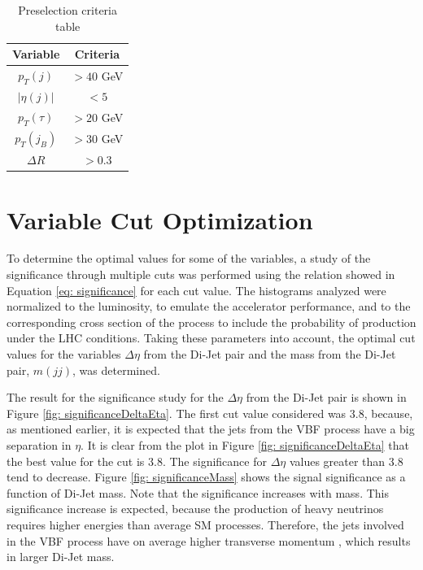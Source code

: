 \begin{table}
\centering
\begin{tabular}{|c|c|}
\hline
Variable & Criteria \\
\hline
$p_{T}(j)$ & $> 40$ GeV \\
$|\eta(j)|$ & $< 5$ \\ 
$p_{T}(\tau)$ & $> 20$ GeV \\
$p_{T}(j_{B})$ & $>30$ GeV \\
$\Delta R$ & $>0.3$ \\
\hline
\end{tabular}
\caption{Preselection criteria table}
\label{table: preselection}
\end{table}

\section{Variable Cut Optimization}\label{section: cutOptimization}

To determine the optimal values for some of the variables, a study of the significance through multiple cuts was performed using the relation showed in Equation \ref{eq: significance} for each cut value. The histograms analyzed were normalized to the luminosity, to emulate the accelerator performance, and to the corresponding cross section of the process to include the probability of production under the LHC conditions. Taking these parameters into account, the optimal cut values for the variables $\Delta \eta$ from the Di-Jet pair and the mass from the Di-Jet pair, $m(jj)$, was determined.

The result for the significance study for the $\Delta \eta$ from the Di-Jet pair is shown in Figure \ref{fig: significanceDeltaEta}. The first cut value considered was 3.8, because, as mentioned earlier, it is expected that the jets from the VBF process have a big separation in $\eta$. It is clear from the plot in Figure \ref{fig: significanceDeltaEta} that the best value for the cut is 3.8. The significance for $\Delta \eta$ values greater than 3.8 tend to decrease. Figure \ref{fig: significanceMass} shows the signal significance as a function of Di-Jet mass. Note that the significance increases with mass. This significance increase is expected, because the production of heavy neutrinos requires higher energies than average SM processes. Therefore, the jets involved in the VBF process have on average higher transverse momentum , which results in larger Di-Jet mass. 

